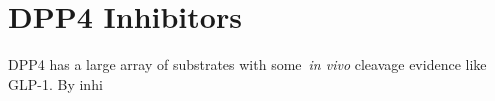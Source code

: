 \section{DPP4 Inhibitors}
DPP4 has a large array of substrates with some~\textit{in vivo} cleavage evidence like GLP-1. By inhi